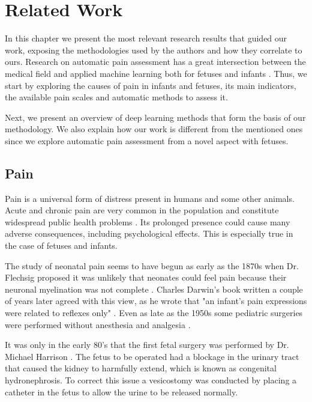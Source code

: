 \chapter{Related Work}

In this chapter we present the most relevant research results that guided our work, exposing the methodologies used by the authors and how they correlate to ours. Research on automatic pain assessment has a great intersection between the medical field and applied machine learning both for fetuses and infants \citep{ZamzmiPGKSA16, Bellieni2012}. Thus, we start by exploring the causes of pain in infants and fetuses, its main indicators, the available pain scales and automatic methods to assess it. 

Next, we present an overview of deep learning methods that form the basis of our methodology. We also explain how our work is different from the mentioned ones since we explore automatic pain assessment from a novel aspect with fetuses.

\section{Pain}

Pain is a universal form of distress present in humans and some other animals. Acute and chronic pain are very common in the population and constitute widespread public health problems \cite{Goldberg2011}. Its prolonged presence could cause many adverse consequences, including psychological effects. This is especially true in the case of fetuses and infants.

The study of neonatal pain seems to have begun as early as the 1870s when Dr. Flechsig proposed it was unlikely that neonates could feel pain because their neuronal myelination was not complete \citep{cope1998neonatal}. Charles Darwin's book written a couple of years later agreed with this view, as he wrote that "an infant's pain expressions were related to reflexes only" \citep{darwin1872expression}. Even as late as the 1950s some pediatric surgeries were performed without anesthesia and analgesia \citep{cope1998neonatal}.

It was only in the early 80's that the first fetal surgery was performed by Dr. Michael Harrison \cite{Harrison1982}. The fetus to be operated had a blockage in the urinary tract that caused the kidney to harmfully extend, which is known as congenital hydronephrosis. To correct this issue a vesicostomy was conducted by placing a catheter in the fetus to allow the urine to be released normally.

